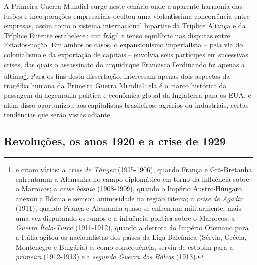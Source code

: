 A Primeira Guerra Mundial surge neste cenário onde a aparente harmonia das fusões e incorporações empresariais ocultou uma violentíssima concorrência entre empresas, assim como o sistema internacional bipartite da Tríplice Aliança e da Tríplice Entente estabeleceu um frágil e tenso equilíbrio nas disputas entre Estados-nação. Em ambos os casos, o expansionismo imperialista -- pela via do colonialismo e da exportação de capitais -- envolvia seus partícipes em sucessivas crises, das quais o assassinato do arquiduque Francisco Ferdinando foi apenas a última\footnote{ e  citam várias: a \textit{crise de Tânger} (1905-1906), quando França e Grã-Bretanha enfrentaram a Alemanha no campo diplomático em torno da influência sobre o Marrocos; a \textit{crise bósnia} (1908-1909), quando o Império Austro-Húngaro anexou a Bósnia e semeou animosidade na região inteira; a \textit{crise de Agadir} (1911), quando França e Alemanha quase se enfrentam militarmente, mais uma vez disputando os rumos e a influência política sobre o Marrocos; a \textit{Guerra Ítalo-Turca} (1911-1912), quando a derrota do Império Otomano para a Itália agitou os nacionalistas dos países da Liga Balcânica (Sérvia, Grécia, Montenegro e Bulgária) e, como consequência, serviu de estopim para a \textit{primeira} (1912-1913) e a \textit{segunda Guerra dos Bálcãs} (1913).}. Para os fins desta dissertação, interessam apenas dois aspectos da tragédia humana da Primeira Guerra Mundial: ela é o marco histórico da passagem da hegemonia política e econômica global da Inglaterra para os EUA, e além disso oportunizou aos capitalistas brasileiros, agrários ou industriais, certas tendências que serão vistas adiante.

\subsection{Revoluções, os anos 1920 e a crise de 1929}

